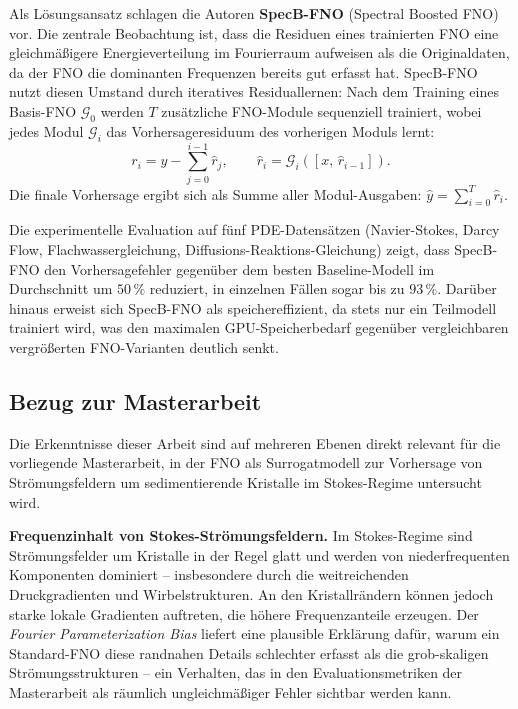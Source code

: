 \documentclass[a4paper,12pt]{article}
\begin{document}
Als L\"osungsansatz schlagen die Autoren \textbf{SpecB-FNO} (Spectral Boosted FNO) vor.
Die zentrale Beobachtung ist, dass die Residuen eines trainierten FNO eine gleichm\"a\ss{}igere
Energieverteilung im Fourierraum aufweisen als die Originaldaten, da der FNO die dominanten
Frequenzen bereits gut erfasst hat. SpecB-FNO nutzt diesen Umstand durch iteratives
Residuallernen: Nach dem Training eines Basis-FNO $\mathcal{G}_0$ werden $T$ zus\"atzliche
FNO-Module sequenziell trainiert, wobei jedes Modul $\mathcal{G}_i$ das Vorhersageresiduum
des vorherigen Moduls lernt:
\[
    r_i = y - \sum_{j=0}^{i-1} \hat{r}_j, \qquad \hat{r}_i = \mathcal{G}_i\!\left([x,\, \hat{r}_{i-1}]\right).
\]
Die finale Vorhersage ergibt sich als Summe aller Modul-Ausgaben:
$\hat{y} = \sum_{i=0}^{T} \hat{r}_i$.

Die experimentelle Evaluation auf f\"unf PDE-Datens\"atzen (Navier-Stokes, Darcy Flow,
Flachwassergleichung, Diffusions-Reaktions-Gleichung) zeigt, dass SpecB-FNO den
Vorhersagefehler gegen\"uber dem besten Baseline-Modell im Durchschnitt um $50\,\%$ reduziert,
in einzelnen F\"allen sogar bis zu $93\,\%$. Dar\"uber hinaus erweist sich SpecB-FNO als
speichereffizient, da stets nur ein Teilmodell trainiert wird, was den maximalen GPU-Speicherbedarf
gegen\"uber vergleichbaren vergr\"o\ss{}erten FNO-Varianten deutlich senkt.

\subsection*{Bezug zur Masterarbeit}

Die Erkenntnisse dieser Arbeit sind auf mehreren Ebenen direkt relevant f\"ur die vorliegende
Masterarbeit, in der FNO als Surrogatmodell zur Vorhersage von Str\"omungsfeldern um
sedimentierende Kristalle im Stokes-Regime untersucht wird.

\textbf{Frequenzinhalt von Stokes-Str\"omungsfeldern.}
Im Stokes-Regime sind Str\"omungsfelder um Kristalle in der Regel glatt und werden von
niederfrequenten Komponenten dominiert -- insbesondere durch die weitreichenden
Druckgradienten und Wirbelstrukturen. An den Kristallr\"andern k\"onnen jedoch starke
lokale Gradienten auftreten, die h\"ohere Frequenzanteile erzeugen. Der \textit{Fourier
Parameterization Bias} liefert eine plausible Erkl\"arung daf\"ur, warum ein Standard-FNO
diese randnahen Details schlechter erfasst als die grob-skaligen Str\"omungsstrukturen --
ein Verhalten, das in den Evaluationsmetriken der Masterarbeit als r\"aumlich ungleichm\"a\ss{}iger
Fehler sichtbar werden kann.
\end{document}
